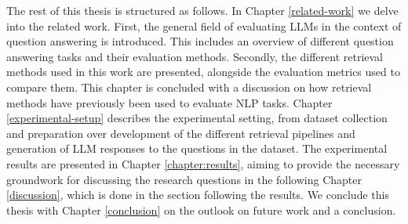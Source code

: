 The rest of this thesis is structured as follows.
In Chapter \ref{related-work} we delve into the related work.
First, the general field of evaluating LLMs in the context of question answering is introduced.
This includes an overview of different question answering tasks and their evaluation methods.
Secondly, the different retrieval methods used in this work are presented, alongside the evaluation metrics used to compare them.
This chapter is concluded with a discussion on how retrieval methods have previously been used to evaluate NLP tasks.
Chapter \ref{experimental-setup} describes the experimental setting, from dataset collection and preparation over development of the different retrieval pipelines and generation of LLM responses to the questions in the dataset.
The experimental results are presented in Chapter \ref{chapter:results}, aiming to provide the necessary groundwork for discussing the research questions in the following Chapter \ref{discussion}, which is done in the section following the results.
We conclude this thesis with Chapter \ref{conclusion} on the outlook on future work and a conclusion.